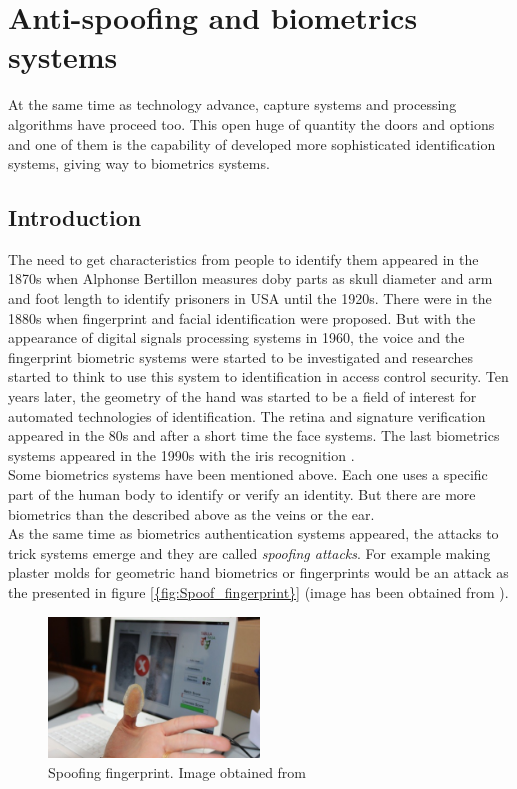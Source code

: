 \section{Anti-spoofing and biometrics systems}
At the same time as technology advance, capture systems and processing algorithms have proceed too. This open huge of quantity the doors and options and one of them is the capability of developed more sophisticated identification systems, giving way to biometrics systems.\\

\subsection{Introduction}
The need to get characteristics from people to identify them appeared in the 1870s when Alphonse Bertillon measures doby parts as skull diameter and arm and foot length to identify prisoners in USA until the 1920s. There were in the 1880s when fingerprint and facial identification were proposed. But with the appearance of digital signals processing systems in 1960, the voice and the fingerprint biometric systems were started to be investigated and researches started to think to use this system to identification in access control security. Ten years later, the geometry of the hand was started to be a field of interest for automated technologies of identification. The retina and signature verification appeared in the 80s and after a short time the face systems. The last biometrics systems appeared in the 1990s with the iris recognition \cite{Intro_biometrics}.\\

Some biometrics systems have been mentioned above. Each one uses a specific part of the human body to identify or verify an identity. But there are more biometrics than the described above as the veins or the ear.\\

As the same time as biometrics authentication systems appeared, the attacks to trick systems emerge and they are called \textit{spoofing attacks}. For example making plaster molds for geometric hand biometrics or fingerprints would be an attack as the presented in figure \ref{{fig:Spoof_fingerprint}} (image has been obtained from \cite{fingerprint_image}).\\


\begin{figure}[htb]
\centering
\includegraphics[width=0.5\textwidth]{images_miscelaneus/spoofing_fingerprint.jpg}
\caption{Spoofing fingerprint. Image obtained from \cite{fingerprint_image}} \label{fig:Spoof_fingerprint}
\end{figure}

